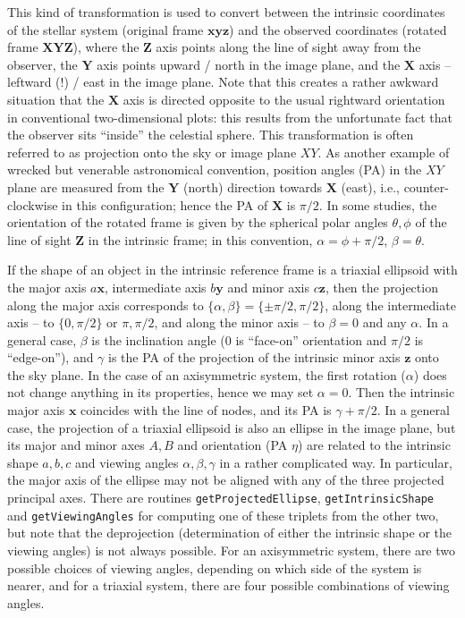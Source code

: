 \documentclass[12pt]{article}
\newcommand{\bx}{\boldsymbol{x}}
\newcommand{\by}{\boldsymbol{y}}
\newcommand{\bz}{\boldsymbol{z}}
\newcommand{\bX}{\boldsymbol{X}}
\newcommand{\bY}{\boldsymbol{Y}}
\newcommand{\bZ}{\boldsymbol{Z}}
\begin{document}
This kind of transformation is used to convert between the intrinsic coordinates of the stellar system (original frame $\bx\by\bz$) and the observed coordinates (rotated frame $\bX\bY\bZ$), where the $\bZ$ axis points along the line of sight away from the observer, the $\bY$ axis points upward / north in the image plane, and the $\bX$ axis -- leftward (!) / east in the image plane.
Note that this creates a rather awkward situation that the $\bX$ axis is directed opposite to the usual rightward orientation in conventional two-dimensional plots: this results from the unfortunate fact that the observer sits ``inside'' the celestial sphere. This transformation is often referred to as projection onto the sky or image plane $XY$. As another example of wrecked but venerable astronomical convention, position angles (PA) in the $XY$ plane are measured from the $\bY$ (north) direction towards $\bX$ (east), i.e., counter-clockwise in this configuration; hence the PA of $\bX$ is $\pi/2$.
In some studies, the orientation of the rotated frame is given by the spherical polar angles $\theta,\phi$ of the line of sight $\bZ$ in the intrinsic frame; in this convention, $\alpha=\phi+\pi/2$, $\beta=\theta$.

If the shape of an object in the intrinsic reference frame is a triaxial ellipsoid with the major axis $a\bx$, intermediate axis $b\by$ and minor axis $c\bz$, then the projection along the major axis corresponds to $\{\alpha,\beta\} = \{\pm\pi/2, \pi/2\}$, along the intermediate axis -- to $\{0, \pi/2\}$ or $\pi,\pi/2$, and along the minor axis -- to $\beta=0$ and any $\alpha$. In a general case, $\beta$ is the inclination angle (0 is ``face-on'' orientation and $\pi/2$ is ``edge-on''), and $\gamma$ is the PA of the projection of the intrinsic minor axis $\bz$ onto the sky plane. 
In the case of an axisymmetric system, the first rotation ($\alpha$) does not change anything in its properties, hence we may set $\alpha=0$. Then the intrinsic major axis $\bx$ coincides with the line of nodes, and its PA is $\gamma+\pi/2$.
In a general case, the projection of a triaxial ellipsoid is also an ellipse in the image plane, but its major and minor axes $A,B$ and orientation (PA $\eta$) are related to the intrinsic shape $a,b,c$ and viewing angles $\alpha,\beta,\gamma$ in a rather complicated way. In particular, the major axis of the ellipse may not be aligned with any of the three projected principal axes. There are routines \texttt{getProjectedEllipse}, \texttt{getIntrinsicShape} and \texttt{getViewingAngles} for computing one of these triplets from the other two, but note that the deprojection (determination of either the intrinsic shape or the viewing angles) is not always possible. For an axisymmetric system, there are two possible choices of viewing angles, depending on which side of the system is nearer, and for a triaxial system, there are four possible combinations of viewing angles. %
\end{document}

